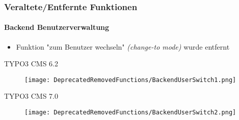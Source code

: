 \begin{frame}[fragile]
	\frametitle{Veraltete/Entfernte Funktionen}
	\framesubtitle{Backend Benutzerverwaltung}

	\begin{itemize}
		\item Funktion "zum Benutzer wechseln" \textit{(change-to mode)} wurde entfernt
	\end{itemize}

	\smaller\tabto{1cm}\begingroup\color{typo3red}TYPO3 CMS 6.2\endgroup\normalsize
	\begin{figure}\vspace{-0.4cm}
		\texttt{[image: DeprecatedRemovedFunctions/BackendUserSwitch1.png]}
	\end{figure}

	\smaller\tabto{1cm}\begingroup\color{typo3red}TYPO3 CMS 7.0\endgroup\normalsize
	\begin{figure}\vspace{-0.4cm}
		\texttt{[image: DeprecatedRemovedFunctions/BackendUserSwitch2.png]}
	\end{figure}

\end{frame}


